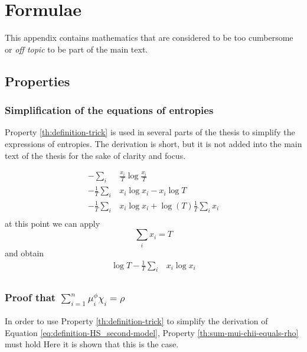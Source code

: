\chapter{Formulae}
\label{cha:app_formulae}

This appendix contains mathematics that are considered to be too cumbersome or \emph{off topic} to be part of the main text.

\section{Properties}

\subsection{Simplification of the equations of entropies}
\label{sec:app_formulae_trick}

Property \ref{th:definition-trick} is used in several parts of the thesis to simplify the expressions of entropies.
The derivation is short, but it is not added into the main text of the thesis for the sake of clarity and focus.

\begin{align*}
              -\sum_i & \frac{x_i}{T} \log\frac{x_i}{T} \\
  -\frac{1}{T} \sum_i & x_i \log x_i - x_i \log T \\
  -\frac{1}{T} \sum_i & x_i \log x_i + \log(T) \frac{1}{T} \sum_i x_i \\
\end{align*}
at this point we can apply
\begin{equation*}
  \sum_i x_i = T
\end{equation*}
and obtain
\begin{align*}
  \log T - \frac{1}{T} \sum_i & x_i \log x_i\\
\end{align*}

\subsection{Proof that $\sum_{i=1}^n \mu_i^\phi \chi_i = \rho$}
\label{sec:app_formulae_proof-sum-HS_second-model}

In order to use Property \ref{th:definition-trick} to simplify the derivation of Equation \eqref{eq:definition-HS_second-model}, Property \ref{th:sum-mui-chii-equals-rho} must hold
Here it is shown that this is the case.

